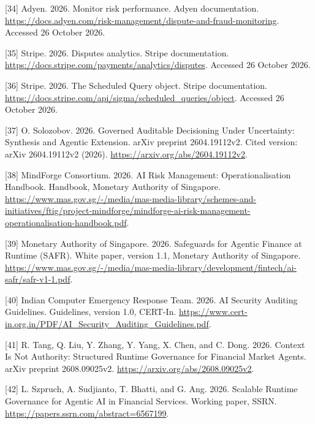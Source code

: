 \documentclass[
  11pt,
]{article}
\newlength{\cslhangindent}
\newlength{\cslentryspacingunit} %
\newenvironment{CSLReferences}[2] %
 {%
  \setlength{\parindent}{0pt}
  \ifodd #1
  \let\oldpar\par
  \def\par{\hangindent=\cslhangindent\oldpar}
  \fi
  \setlength{\parskip}{#2\cslentryspacingunit}
 }%
 {}
\begin{document}
\begin{CSLReferences}{1}{1}
\leavevmode{}%
{[}34{]} Adyen. 2026. Monitor risk performance. Adyen documentation.
\url{https://docs.adyen.com/risk-management/dispute-and-fraud-monitoring}.
Accessed 26 October 2026.

\leavevmode{}%
{[}35{]} Stripe. 2026. Disputes analytics. Stripe documentation.
\url{https://docs.stripe.com/payments/analytics/disputes}. Accessed 26
October 2026.

\leavevmode{}%
{[}36{]} Stripe. 2026. The Scheduled Query object. Stripe documentation.
\url{https://docs.stripe.com/api/sigma/scheduled_queries/object}.
Accessed 26 October 2026.

\leavevmode{}%
{[}37{]} O. Solozobov. 2026. Governed Auditable Decisioning Under
Uncertainty: Synthesis and Agentic Extension. arXiv preprint
2604.19112v2. Cited version: arXiv 2604.19112v2 (2026).
\url{https://arxiv.org/abs/2604.19112v2}.

\leavevmode{}%
{[}38{]} MindForge Consortium. 2026. AI Risk Management:
Operationalisation Handbook. Handbook, Monetary Authority of Singapore.
\url{https://www.mas.gov.sg/-/media/mas-media-library/schemes-and-initiatives/ftig/project-mindforge/mindforge-ai-risk-management-operationalisation-handbook.pdf}.

\leavevmode{}%
{[}39{]} Monetary Authority of Singapore. 2026. Safeguards for Agentic
Finance at Runtime (SAFR). White paper, version 1.1, Monetary Authority
of Singapore.
\url{https://www.mas.gov.sg/-/media/mas-media-library/development/fintech/ai-safr/safr-v1-1.pdf}.

\leavevmode{}%
{[}40{]} Indian Computer Emergency Response Team. 2026. AI Security
Auditing Guidelines. Guidelines, version 1.0, CERT-In.
\url{https://www.cert-in.org.in/PDF/AI_Security_Auditing_Guidelines.pdf}.

\leavevmode{}%
{[}41{]} R. Tang, Q. Liu, Y. Zhang, Y. Yang, X. Chen, and C. Dong. 2026.
Context Is Not Authority: Structured Runtime Governance for Financial
Market Agents. arXiv preprint 2608.09025v2.
\url{https://arxiv.org/abs/2608.09025v2}.

\leavevmode{}%
{[}42{]} L. Szpruch, A. Sudjianto, T. Bhatti, and G. Ang. 2026. Scalable
Runtime Governance for Agentic AI in Financial Services. Working paper,
SSRN. \url{https://papers.ssrn.com/abstract=6567199}.


\end{CSLReferences}
\end{document}
